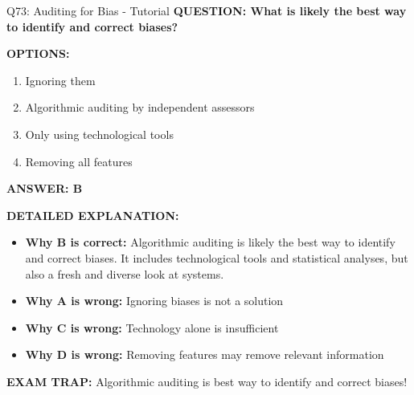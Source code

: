 \documentclass[8pt]{beamer}
\begin{document}
	\begin{frame}{Q73: Auditing for Bias - Tutorial}
		\fontsize{6.5}{7.5}\selectfont
		\textbf{QUESTION: What is likely the best way to identify and correct biases?}
		
		\vspace{0.1cm}
		\textbf{OPTIONS:}
		\begin{enumerate}
			\item Ignoring them
			\item Algorithmic auditing by independent assessors
			\item Only using technological tools
			\item Removing all features
		\end{enumerate}
		
		\vspace{0.1cm}
		\textcolor{myblue}{\textbf{ANSWER: B}}
		
		\vspace{0.1cm}
		\textbf{DETAILED EXPLANATION:}
		\begin{itemize}
			\item \textbf{Why B is correct:} Algorithmic auditing is likely the best way to identify and correct biases. It includes technological tools and statistical analyses, but also a fresh and diverse look at systems.
			\item \textbf{Why A is wrong:} Ignoring biases is not a solution
			\item \textbf{Why C is wrong:} Technology alone is insufficient
			\item \textbf{Why D is wrong:} Removing features may remove relevant information
		\end{itemize}
		
		\textcolor{myred}{\textbf{EXAM TRAP:}} Algorithmic auditing is \textcolor{myblue}{best way to identify and correct biases}!
	\end{frame}
	
\end{document}
